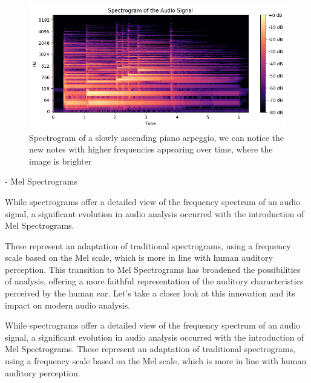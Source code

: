 \documentclass[11pt]{article}
\begin{document}
\begin{figure}[h]
  \centering
  \begin{minipage}{0.9\textwidth}
    \centering
    \includegraphics[width=1\textwidth]{"image/Spectrogram_piano.png"}
    \caption{Spectrogram of a slowly ascending piano arpeggio, we can notice the new notes with higher frequencies appearing over time, where the image is brighter}
    \label{fig:Spectrogram_piano}
  \end{minipage}\hfill
\end{figure}


    - Mel Spectrograms
    
While spectrograms offer a detailed view of the frequency spectrum of an audio signal, a significant evolution in audio analysis occurred with the introduction of Mel Spectrograms.

These represent an adaptation of traditional spectrograms, using a frequency scale based on the Mel scale, which is more in line with human auditory perception. This transition to Mel Spectrograms has broadened the possibilities of analysis, offering a more faithful representation of the auditory characteristics perceived by the human ear. Let's take a closer look at this innovation and its impact on modern audio analysis.

While spectrograms offer a detailed view of the frequency spectrum of an audio signal, a significant evolution in audio analysis occurred with the introduction of Mel Spectrograms. These represent an adaptation of traditional spectrograms, using a frequency scale based on the Mel scale, which is more in line with human auditory perception.
\end{document}
